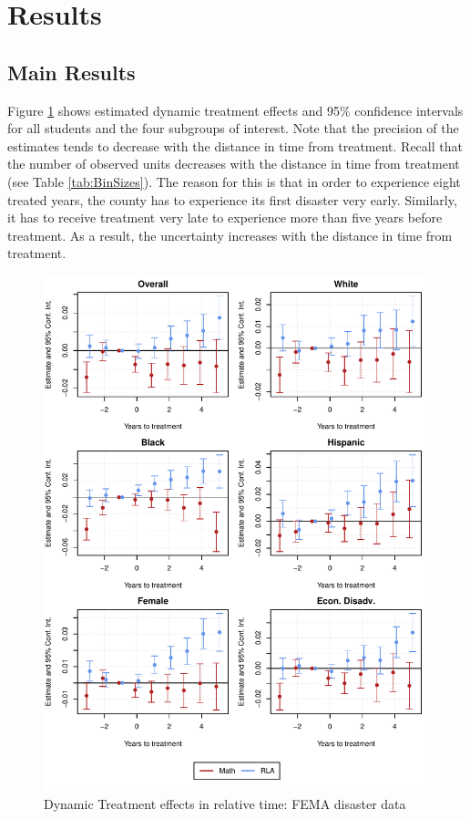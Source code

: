 \section{Results} \label{Results}

\subsection{Main Results}

Figure \ref{ResultsPlot} shows estimated dynamic treatment effects and 95\% confidence intervals for all students and the four subgroups of interest. Note that the precision of the estimates tends to decrease with the distance in time from treatment. Recall that the number of observed units decreases with the distance in time from treatment (see Table \ref{tab:BinSizes}). The reason for this is that in order to experience eight treated years, the county has to experience its first disaster very early. Similarly, it has to receive treatment very late to experience more than five years before treatment. As a result, the uncertainty increases with the distance in time from treatment.

\begin{figure}[!h]
	\centering
	\includegraphics[scale=1]{"../Code & Data/ResultsPlot.pdf"}
	\caption{Dynamic Treatment effects in relative time: FEMA disaster data}
	\label{ResultsPlot}
\end{figure}

